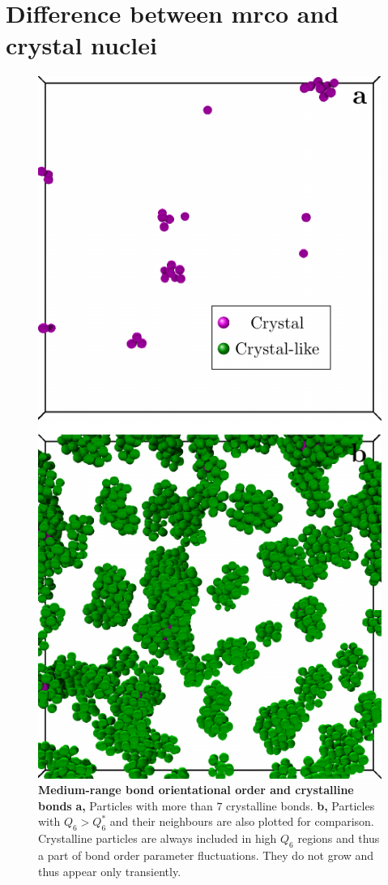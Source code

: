 \documentclass[prl,twocolumn,notitlepage]{revtex4-1}
\begin{document}
\section*{Difference between {\sc mrco} and crystal nuclei}

\begin{figure}
\begin{center}
\includegraphics{generate_figures-figure4.pdf}
\end{center}
\caption{\textbf{Medium-range bond orientational order and crystalline bonds} {\bf a,} Particles with more than $7$ crystalline bonds.  {\bf b,} Particles with $Q_6>Q_6^*$ and their neighbours are also plotted for comparison. Crystalline particles are always included in high $Q_6$ regions and thus a part of bond order parameter fluctuations. They do not grow and thus appear only transiently.}
	\label{fig:X_3D}
\end{figure}
\end{document}
